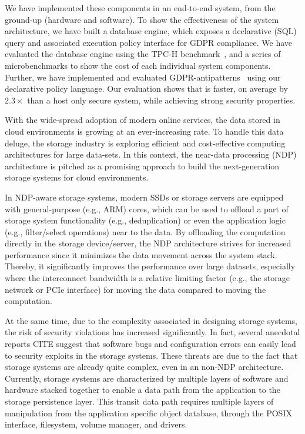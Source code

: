 We have implemented these components in an end-to-end system, from the ground-up (hardware and software).
To show the effectiveness of the \project system architecture, we have built a \csd database engine, which exposes a declarative (SQL) query and associated execution policy interface for GDPR compliance. We have evaluated the \project database engine using the TPC-H benchmark~\cite{tpch-benchmark}, and a series of microbenchmarks to show the cost of each individual system components. Further, we have implemented and evaluated GDPR-antipatterns~\cite{gdpr} using our declarative policy language. Our evaluation shows that \project is faster, on average by $2.3\times$ than a host only secure system, while achieving strong security properties. 

\fi





With the wide-spread adoption of modern online services, the
data stored in cloud environments is growing at an ever-increasing
rate. To handle this data deluge, the storage industry is exploring efficient and cost-effective computing architectures for large data-sets. In this context, the near-data processing (NDP) architecture is pitched as a promising approach to build the next-generation storage systems for cloud environments. 

In NDP-aware storage systems, modern SSDs or storage servers are equipped with general-purpose (e.g., ARM) cores, which can be used to offload a part of storage system functionality (e.g., deduplication) %
or even the application logic (e.g., filter/select operations) near to the data. By offloading the computation directly in the storage device/server, the NDP architecture strives for increased performance since it minimizes the data movement across the system stack. Thereby, it significantly improves the performance over large datasets, especially where the interconnect bandwidth is a relative limiting factor (e.g., the storage network or PCIe interface) for moving the data compared to moving the computation.



At the same time, due to the complexity associated in designing storage systems, the risk of security violations has increased significantly. In fact, several anecdotal reports CITE suggest that software bugs and configuration errors can easily lead to security exploits in the storage systems.
These threats are due to the fact that storage systems are already quite complex, even in an non-NDP architecture. Currently, storage systems are characterized by multiple layers of software and hardware stacked together to enable a data path from the application to the storage persistence layer. This transit data path
requires multiple layers of manipulation from the application specific object database, through the POSIX interface, filesystem, volume manager, and drivers.

